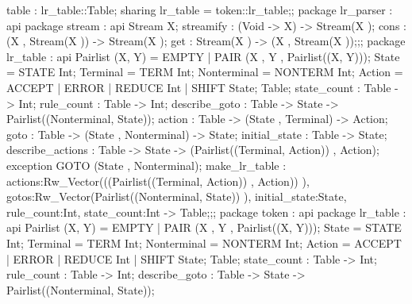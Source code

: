 {{                table : lr_table::Table;
            sharing lr_table = token::lr_table};;
        package lr_parser
          : api {   package stream
                      : api {
                            Stream X;
                            streamify : (Void -> X) -> Stream(X );
                            cons : (X , Stream(X )) -> Stream(X );
                            get : Stream(X ) -> (X , Stream(X ));};;
                    package lr_table
                      : api {
                            Pairlist (X, Y) = EMPTY | PAIR (X , Y , Pairlist((X, Y)));
                            State  = STATE Int;
                            Terminal  = TERM Int;
                            Nonterminal  = NONTERM Int;
                            Action  = ACCEPT | ERROR | REDUCE Int | SHIFT State;
                            Table;
                            state_count : Table -> Int;
                            rule_count : Table -> Int;
                            describe_goto : Table -> State -> Pairlist((Nonterminal, State));
                            action : Table -> (State , Terminal) -> Action;
                            goto : Table -> (State , Nonterminal) -> State;
                            initial_state : Table -> State;
                            describe_actions : Table -> State -> (Pairlist((Terminal, Action)) , Action);
                            exception GOTO (State , Nonterminal);
                                make_lr_table :
                                        {actions:Rw_Vector(((Pairlist((Terminal, Action)) , Action)) ),
                                        gotos:Rw_Vector(Pairlist((Nonterminal, State)) ), initial_state:State, rule_count:Int,
                                        state_count:Int}
                                    ->
                                    Table;};;
                    package token
                      : api {   package lr_table
                                  : api {
                                        Pairlist (X, Y) = EMPTY | PAIR (X , Y , Pairlist((X, Y)));
                                        State  = STATE Int;
                                        Terminal  = TERM Int;
                                        Nonterminal  = NONTERM Int;
                                        Action  = ACCEPT | ERROR | REDUCE Int | SHIFT State;
                                        Table;
                                        state_count : Table -> Int;
                                        rule_count : Table -> Int;
                                        describe_goto : Table -> State -> Pairlist((Nonterminal, State));
}}}}
